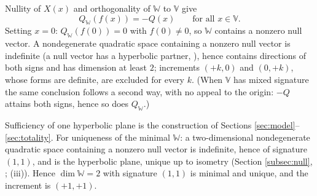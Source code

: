 Nullity of $X(x)$ and orthogonality of $\mathbb{W}$ to $\mathbb{V}$ give
\[
Q_{\mathbb{W}}(f(x)) = -Q(x) \qquad \text{for all } x \in \mathbb{V}.
\]
Setting $x = 0$: $Q_{\mathbb{W}}(f(0)) = 0$ with $f(0) \neq 0$, so $\mathbb{W}$ contains a nonzero null vector. A nondegenerate quadratic space containing a nonzero null vector is indefinite \cite{Lam2005} (a null vector has a hyperbolic partner, ), hence contains directions of both signs and has dimension at least $2$; increments $(+k,0)$ and $(0,+k)$, whose forms are definite, are excluded for every $k$. (When $\mathbb{V}$ has mixed signature the same conclusion follows a second way, with no appeal to the origin: $-Q$ attains both signs, hence so does $Q_{\mathbb{W}}$.)

Sufficiency of one hyperbolic plane is the construction of Sections \ref{sec:model}--\ref{sec:totality}. For uniqueness of the minimal $\mathbb{W}$: a two-dimensional nondegenerate quadratic space containing a nonzero null vector is indefinite, hence of signature $(1,1)$, and is the hyperbolic plane, unique up to isometry (Section \ref{subsec:null}, \cite{Lam2005}; (iii)). Hence $\dim \mathbb{W} = 2$ with signature $(1,1)$ is minimal and unique, and the increment is $(+1,+1)$.
